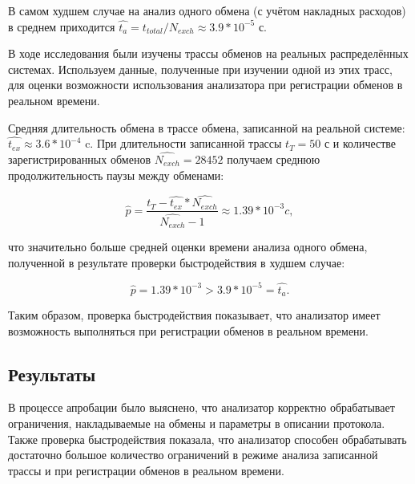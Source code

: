 В самом худшем случае на анализ одного обмена (с учётом накладных расходов) в 
среднем приходится $\hat{t_{a}} = t_{total} / N_{exch} \approx 3.9 * 10^{-5}$ 
с. 

В ходе исследования были изучены трассы обменов на реальных распределённых 
системах. Используем данные, полученные при изучении одной из этих трасс, для 
оценки возможности использования анализатора при регистрации обменов в реальном 
времени.

Средняя длительность обмена в трассе обмена, записанной на реальной системе: 
$\hat{t_{ex}} \approx 3.6 * 10^{-4}$ c. При длительности записанной трассы 
$t_{T} = 50$ с и количестве зарегистрированных обменов $\hat{N_{exch}} = 28452$ 
получаем среднюю продолжительность паузы между обменами:

$$
\hat{p} = \frac{t_{T} - \hat{t_{ex}} * \hat{N_{exch}}}{\hat{N_{exch}} - 1} 
\approx 1.39 * 10^{-3} c,
$$

что значительно больше средней оценки времени анализа одного обмена, полученной 
в результате проверки быстродействия в худшем случае:

$$
\hat{p} = 1.39 * 10^{-3} > 3.9 * 10^{-5} = \hat{t_{a}}.
$$

Таким образом, проверка быстродействия показывает, что анализатор имеет
возможность выполняться при регистрации обменов в реальном времени.

\subsection{Результаты}

В процессе апробации было выяснено, что анализатор корректно обрабатывает 
ограничения, накладываемые на обмены и параметры в описании протокола. Также 
проверка быстродействия показала, что анализатор способен обрабатывать 
достаточно большое количество ограничений в режиме анализа записанной трассы 
и при регистрации обменов в реальном времени.